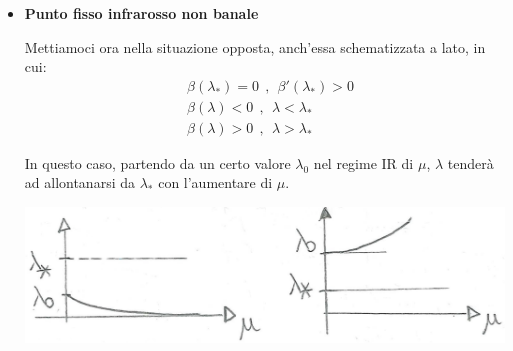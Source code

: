 \documentclass[../main.tex]{subfiles}
\begin{document}
\begin{itemize}
    \item \textbf{Punto fisso infrarosso non banale}

    Mettiamoci ora nella situazione opposta, anch'essa schematizzata a lato, in cui:
    \begin{align*}
        &\beta(\lambda_\ast) = 0 ~~,~~ \beta'(\lambda_\ast)>0 \\
        &\beta(\lambda) < 0 ~~,~~   \lambda < \lambda_\ast \\
        &\beta(\lambda) > 0 ~~,~~   \lambda > \lambda_\ast
    \end{align*}

    In questo caso, partendo da un certo valore $\lambda_0$ nel regime IR di $\mu$, $\lambda$ tenderà ad allontanarsi da $\lambda_\ast$ con l'aumentare di $\mu$. 

    \includegraphics[]{images_ch5/ir_lambdavsmu.jpg}
    

\end{itemize}
\end{document}
